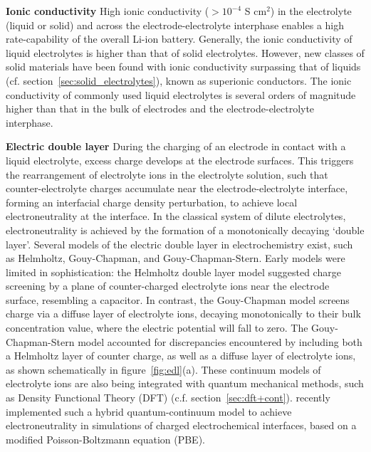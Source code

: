 \documentclass[../main.tex]{subfiles}
\begin{document}
\textbf{Ionic conductivity} High ionic conductivity ($>10^{-4}$ S cm$^2$) in the electrolyte (liquid or solid) and across the electrode-electrolyte interphase enables a high rate-capability of the overall Li-ion battery.\cite{park2010review,Goodenough2010,Kamaya2011} Generally, the ionic conductivity of liquid electrolytes is higher than that of solid electrolytes. However, new classes of solid materials have been found with ionic conductivity surpassing that of liquids (cf. section~\ref{sec:solid_electrolytes}), known as superionic conductors. The ionic conductivity of commonly used liquid electrolytes is several orders of magnitude higher than that in the bulk of electrodes and the electrode-electrolyte interphase.\cite{park2010review}

\textbf{Electric double layer} During the charging of an electrode in contact with a liquid electrolyte, excess charge develops at the electrode surfaces. This triggers the rearrangement of electrolyte ions in the electrolyte solution, such that counter-electrolyte charges accumulate near the electrode-electrolyte interface, forming an interfacial charge density perturbation, to achieve local electroneutrality at the interface. In the classical system of dilute electrolytes, electroneutrality is achieved by the formation of a monotonically decaying `double layer'.\cite{Schmickler2010}  Several models of the electric double layer in electrochemistry exist, such as Helmholtz, Gouy-Chapman, and Gouy-Chapman-Stern.\cite{Bard2010} Early models were limited in sophistication: the Helmholtz double layer model suggested charge screening by a plane of counter-charged electrolyte ions near the electrode surface, resembling a capacitor. In contrast, the Gouy-Chapman model screens charge via a diffuse layer of electrolyte ions, decaying monotonically to their bulk concentration value, where the electric potential will fall to zero. The Gouy-Chapman-Stern model accounted for discrepancies encountered by including both a Helmholtz layer of counter charge, as well as a diffuse layer of electrolyte ions, as shown schematically in figure~\ref{fig:edl}(a). These continuum models of electrolyte ions are also being integrated with quantum mechanical methods, such as Density Functional Theory (DFT) (c.f. section~\ref{sec:dft+cont}). \citeauthor{neutralization-paper} recently implemented such a hybrid quantum-continuum model to achieve electroneutrality in simulations of charged electrochemical interfaces, based on a modified Poisson-Boltzmann equation (PBE).\cite{neutralization-paper}
\end{document}
